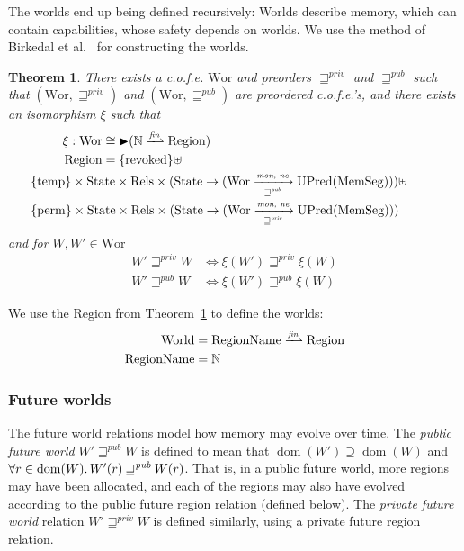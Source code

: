 \documentclass[compsoc,conference,letterpaper,fleqn]{IEEEtran}
\newtheorem{theorem}{Theorem}
\newcommand{\finparfun}{\xrightharpoonup{\textit{\tiny{fin}}}}
\newcommand{\fun}{\rightarrow}
\DeclareMathOperator{\dom}{dom}
\newcommand{\blater}{\mathop{\blacktriangleright}}
\newcommand{\cofe}{c.o.f.e.}
\newcommand{\cofes}{\cofe{}'s}
\newcommand{\var}[1]{\mathit{#1}}
\newcommand{\futurewk}{\mathbin{\sqsupseteq}^{\var{pub}}}
\newcommand{\futurestr}{\mathbin{\sqsupseteq}^{\var{priv}}}
\newcommand{\monwknefun}{\xrightarrow[\text{\tiny{$\futurewk$}}]{\textit{\tiny{mon, ne}}}}
\newcommand{\monstrnefun}{\xrightarrow[\text{\tiny{$\futurestr$}}]{\textit{\tiny{mon, ne}}}}
\newcommand{\plaindom}[1]{\mathrm{#1}}
\newcommand{\HeapSegments}{\plaindom{MemSeg}}
\newcommand{\nats}{\mathbb{N}}
\newcommand{\Rels}{\plaindom{Rels}}
\newcommand{\States}{\plaindom{State}}
\newcommand{\RegionNames}{\plaindom{RegionName}}
\newcommand{\Regions}{\plaindom{Region}}
\newcommand{\Worlds}{\plaindom{World}}
\newcommand{\Wor}{\plaindom{Wor}}
\newcommand{\UPred}[1]{\plaindom{UPred}(#1)}
\newcommand{\plainview}[1]{\mathrm{#1}}
\newcommand{\perma}{\plainview{perm}}
\newcommand{\temp}{\plainview{temp}}
\newcommand{\revoked}{\plainview{revoked}}
\begin{document}

The worlds end up being defined recursively: Worlds describe memory,
which can contain capabilities, whose safety depends on worlds. 
We use the method of Birkedal et
al.~\cite{Birkedal:2011:SKM:1926385.1926401} 
for constructing the worlds.

\begin{theorem}\label{thm:world-existence}
  There exists a \cofe{} $\Wor$ and preorders $\futurestr$ and
  $\futurewk$ such that $(\Wor,\futurestr)$ and $(\Wor,\futurewk)$ are
  preordered \cofes{}, and there exists an isomorphism $\xi$ such that
  {\small
    \begin{align*}              
      \xi : \Wor & \cong \blater (\nats \finparfun \Regions)\\
      \Regions & = \{\revoked\} \uplus \\
                 &\hskip -2cm \{\temp\} \times \States \times \Rels \times (\States \fun (\Wor \monwknefun \UPred{\HeapSegments})) \uplus \\
                 & \hskip -2cm \{\perma\} \times \States \times \Rels \times (\States \fun (\Wor \monstrnefun \UPred{\HeapSegments}))
    \end{align*}
  } and for $W, W' \in \Wor$
  \begin{align*}
    W' \futurestr W & \Leftrightarrow \xi(W') \futurestr \xi(W)   \\
    W' \futurewk W & \Leftrightarrow \xi(W') \futurewk \xi(W)
  \end{align*}
\end{theorem}
We use the $\Regions$ from Theorem~\ref{thm:world-existence} to define
the worlds:
\begin{align*}
  \Worlds & = \RegionNames \finparfun \Regions\\
 \RegionNames & = \nats
\end{align*}

\subsubsection{Future worlds}
The future world relations model how memory may evolve over time. 
The \emph{public future world} 
$W' \futurewk W$ is defined to mean that $\dom(W') \supseteq \dom(W)$
and $\forall r \in \dom(W) \ldotp W'(r) \futurewk W(r)$.  That is,
in a public future world, more regions may have been allocated, and
each of the regions may also have evolved according to the public future
region relation (defined below). The \emph{private future world} relation
$W' \futurestr W$ is defined similarly, using a private future region
relation.
\end{document}
